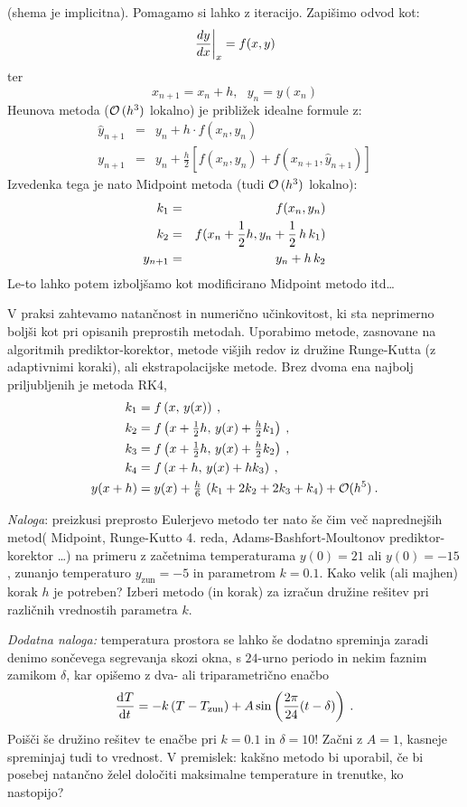 \documentclass[slovene,11pt,a4paper]{article}
\newcommand{\ddd}{\mathrm{d}}
\newcommand{\Dd}[3][{}]{\frac{\ddd^{#1} #2}{\ddd #3^{#1}}}
\begin{document}
(shema je implicitna). Pomagamo si lahko z iteracijo.
Zapi\v simo odvod kot:
$$ \left.{dy \over dx}\right|_x = f(x,y) $$ ter $$ x_{n+1} = x_n + h,
~~~ y_n = y(x_n)$$
Heunova metoda (${\cal O}\,(h^3 )$ lokalno) je pribli\v zek idealne formule z:
\begin{eqnarray}
\hat{y}_{n+1} & =  & y_n +  h \cdot f(x_n,y_n) \\
y_{n+1} & = & y_n + \frac{h}{2} \left[ f(x_n,y_n) + f(x_{n+1},\hat{y}_{n+1})\right]
\end{eqnarray}
Izvedenka tega je nato Midpoint metoda  (tudi ${\cal O}\,(h^3 )$ lokalno):
\begin{eqnarray}
k_1 & = & f(x_n,y_n) \\
k_2 & = & f(x_n+{1 \over 2}h,y_n+{1 \over 2}\, h\,k_1) \\
y_{n+1} & = & y_n + h\,k_2
\end{eqnarray}
Le-to lahko potem izbolj\v samo kot modificirano Midpoint metodo
itd\ldots

V praksi zahtevamo natančnost in numerično učinkovitost,
ki sta neprimerno boljši kot pri opisanih preprostih metodah.
Uporabimo metode, zasnovane na algoritmih prediktor-korektor,
metode višjih redov iz družine Runge-Kutta (z adaptivnimi koraki), ali ekstrapolacijske metode.
Brez dvoma ena najbolj priljubljenih je metoda RK4,
\begin{align}
k_1 & =
  f\left(x,\,{y}(x)\right) \> {,}\nonumber\\
k_2 & =
  f\left(x+{\textstyle{1\over 2}}h,\,
       {y}(x)+{\textstyle{h\over 2}}k_1\right) \> {,}\nonumber\\
k_3 & =
  f\left(x+{\textstyle{1\over 2}}h,\,
       {y}(x)+{\textstyle{h\over 2}}k_2\right) \> {,}\label{eq:rk4}\\
k_4 & =  f\left(x+h,\,{y}(x)+hk_3\right) \> {,}\nonumber\\
{y}(x+h) & =  {y}(x)
  + {\tfrac{h}{6}}\,\left(k_1 + 2k_2 + 2k_3 + k_4\right) + {\cal O}(h^5)
  \nonumber\> {.}
\end{align}

\bigskip

{\it Naloga\/}: preizkusi preprosto Eulerjevo metodo ter nato še čim več 
naprednejših metod( Midpoint, Runge-Kutto 4. reda, Adams-Bashfort-Moultonov prediktor-korektor \ldots ) na primeru
z začetnima temperaturama $y(0)=21$ ali $y(0)=-15$,
zunanjo temperaturo $y_\mathrm{zun}=-5$ in parametrom $k=0.1$.
Kako velik (ali majhen) korak $h$ je potreben?
Izberi metodo (in korak) za izračun družine rešitev
pri različnih vrednostih parametra $k$.

\bigskip

{\it Dodatna naloga\/:} temperatura prostora se lahko še
dodatno spreminja zaradi denimo sončevega segrevanja
skozi okna, s $24$-urno periodo in nekim faznim zamikom $\delta$,
kar opišemo z dva- ali triparametrično enačbo
\begin{equation}
\Dd{T}{t} = - k \left( T-T_\mathrm{zun} \right)
+ A\sin\left( {2\pi\over 24}(t-\delta) \right) \>.
\label{cooling2}
\end{equation}
Poišči še družino rešitev te enačbe pri
$k=0.1$ in $\delta=10$!  Začni z $A=1$, kasneje spreminjaj tudi
to vrednost.  V premislek: kakšno metodo bi uporabil, če bi posebej
natančno želel določiti maksimalne temperature in trenutke,
ko nastopijo?
\end{document}
